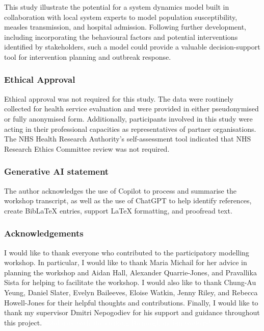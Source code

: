 \documentclass[12pt]{article}
\newcounter{who}
\begin{document}
This study illustrate the potential for a system dynamics model built in collaboration with local system experts to model population susceptibility, measles transmission, and hospital admission. Following further development, including incorporating the behavioural factors and potential interventions identified by stakeholders, such a model could provide a valuable decision-support tool for intervention planning and outbreak response.

\subsubsection*{Ethical Approval}
Ethical approval was not required for this study. The data were routinely collected for health service evaluation and were provided in either pseudonymised or fully anonymised form. Additionally, participants involved in this study were acting in their professional capacities as representatives of partner organisations. The NHS Health Research Authority's self-assessment tool indicated that NHS Research Ethics Committee review was not required.

\subsubsection*{Generative AI statement}

The author acknowledges the use of Copilot to process and summarise the workshop transcript, as well as the use of ChatGPT to help identify references, create BibLaTeX entries, support LaTeX formatting, and proofread text. 

\subsubsection*{Acknowledgements}

I would like to thank everyone who contributed to the participatory modelling workshop. In particular, I would like to thank Maria Michail for her advice in planning the workshop and Aidan Hall, Alexander Quarrie-Jones, and Pravallika Sista for helping to facilitate the workshop. I would also like to thank Chung-Au Yeung, Daniel Slater, Evelyn Baileeves, Eloise Watkin, Jenny Riley, and Rebecca Howell-Jones for their helpful thoughts and contributions. Finally, I would like to thank my supervisor Dmitri Nepogodiev for his support and guidance throughout this project. \textcolor{white}{Solidarity with the striking Birmingham bin workers!} 
\end{document}
